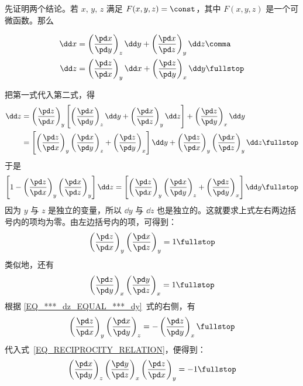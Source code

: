     \begin{myProof}
      先证明两个结论。若 $x, \, y, \, z$ 满足 $F(x, y, z) = \const$，其中 $F(x, y, z)$ 是一个可微函数。那么
      \begin{mySubEq}
        \begin{align}
          \dd x &= \left( \frac{\pd x}{\pd y} \right)_z \dd y + \left( \frac{\pd x}{\pd z} \right)_y \dd z \comma \\
          \dd z &= \left( \frac{\pd z}{\pd x} \right)_y \dd x + \left( \frac{\pd z}{\pd y} \right)_x \dd y \fullstop
        \end{align}
      \end{mySubEq}
      把第一式代入第二式，得
      \begin{equation}
        \begin{aligned}
          \dd z &= \left( \frac{\pd z}{\pd x} \right)_y \left[ \left( \frac{\pd x}{\pd y} \right)_z \dd y + \left( \frac{\pd x}{\pd z} \right)_y \dd z \right] + \left( \frac{\pd z}{\pd y} \right)_x \dd y \\
          &= \left[ \left( \frac{\pd z}{\pd x} \right)_y \left( \frac{\pd x}{\pd y} \right)_z + \left( \frac{\pd z}{\pd y} \right)_x \right] \dd y
          + \left( \frac{\pd z}{\pd x} \right)_y \left( \frac{\pd x}{\pd z} \right)_y \dd z \fullstop
        \end{aligned}
      \end{equation}
      于是
      \begin{equation} \label{EQ_***_dz_EQUAL_***_dy}
         \left[ 1 - \left( \frac{\pd z}{\pd x} \right)_y \left( \frac{\pd x}{\pd z} \right)_y \right] \dd z
        = \left[ \left( \frac{\pd z}{\pd x} \right)_y \left( \frac{\pd x}{\pd y} \right)_z + \left( \frac{\pd z}{\pd y} \right)_x \right] \dd y \fullstop
      \end{equation}
      因为 $y$ 与 $z$ 是独立的变量，所以 $\dd y$ 与 $\dd z$ 也是独立的。这就要求上式左右两边括号内的项均为零。由左边括号内的项，可得到：
      \begin{equation}
        \left( \frac{\pd z}{\pd x} \right)_y \left( \frac{\pd x}{\pd z} \right)_y = 1 \fullstop
      \end{equation}
      类似地，还有
      \begin{equation} \label{EQ_RECIPROCITY_RELATION}
        \left( \frac{\pd z}{\pd y} \right)_x \left( \frac{\pd y}{\pd z} \right)_x = 1 \fullstop
      \end{equation}
      根据 \eqref{EQ_***_dz_EQUAL_***_dy}~式的右侧，有
      \begin{equation} \label{EQ_CYCLIC_RELATION}
        \left( \frac{\pd z}{\pd x} \right)_y \left( \frac{\pd x}{\pd y} \right)_z = -\left( \frac{\pd z}{\pd y} \right)_x \fullstop
      \end{equation}
      代入式~\eqref{EQ_RECIPROCITY_RELATION}，便得到：
      \begin{equation}
        \left( \frac{\pd x}{\pd y} \right)_z \left( \frac{\pd y}{\pd z} \right)_x \left( \frac{\pd z}{\pd x} \right)_y = -1 \fullstop
      \end{equation}
      

\end{myProof}
